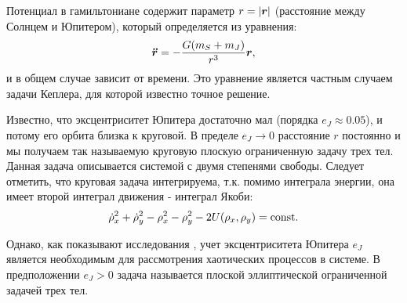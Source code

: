 Потенциал в гамильтониане содержит параметр $r = |\boldsymbol{r}|$ (расстояние между Солнцем и Юпитером), который определяется из уравнения:
$$\boldsymbol{\ddot{r}} = -\frac{G(m_S+m_J)}{r^3} \boldsymbol{r},$$
и в общем случае зависит от времени. Это уравнение является частным случаем задачи Кеплера, для которой известно точное решение. 

Известно, что эксцентриситет Юпитера достаточно мал (порядка $e_{J}\approx 0.05$), и потому его орбита близка к круговой. В пределе $e_{J}\to 0$ расстояние $r$ постоянно и мы получаем так называемую круговую плоскую ограниченную задачу трех тел. Данная задача описывается системой с двумя степенями свободы. Следует отметить, что круговая задача интегрируема, т.к. помимо интеграла энергии, она имеет второй интеграл движения - интеграл Якоби:
$$
\dot \rho_{x}^{2} + \dot \rho_{y}^{2} - \rho_{x}^{2} - \rho_{y}^{2} - 2 U(\rho_{x}, \rho_{y}) = {\rm const}.
$$

Однако, как показывают исследования \cite{fejoz, kaloshin}, учет эксцентриситета Юпитера $e_J$ является необходимым для рассмотрения хаотических процессов в системе. В предположении $e_{J}>0$ задача называется плоской эллиптической ограниченной задачей трех тел. 
